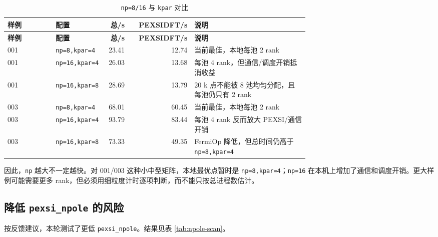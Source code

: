 \documentclass[a4paper,11pt]{article}
\newcommand{\code}[1]{\texttt{#1}}
\begin{document}
{\scriptsize
\begin{longtable}{@{}p{0.16\linewidth}p{0.16\linewidth}r r p{0.38\linewidth}@{}}
\caption{\code{np=8/16} 与 \code{kpar} 对比}
\label{tab:np8-16}\\
\toprule
\textbf{样例} & \textbf{配置} & \textbf{总/s} & \textbf{PEXSIDFT/s} & \textbf{说明}\\
\midrule
\endfirsthead
\toprule
\textbf{样例} & \textbf{配置} & \textbf{总/s} & \textbf{PEXSIDFT/s} & \textbf{说明}\\
\midrule
\endhead
001 & \code{np=8,kpar=4} & 23.41 & 12.74 & 当前最佳，本地每池 2 rank\\
001 & \code{np=16,kpar=4} & 26.03 & 13.68 & 每池 4 rank，但通信/调度开销抵消收益\\
001 & \code{np=16,kpar=8} & 28.69 & 13.79 & 20 k 点不能被 8 池均匀分配，且每池仍只有 2 rank\\
003 & \code{np=8,kpar=4} & 68.01 & 60.45 & 当前最佳，本地每池 2 rank\\
003 & \code{np=16,kpar=4} & 93.79 & 83.44 & 每池 4 rank 反而放大 PEXSI/通信开销\\
003 & \code{np=16,kpar=8} & 73.33 & 49.35 & FermiOp 降低，但总时间仍高于 \code{np=8,kpar=4}\\
\bottomrule
\end{longtable}
}

因此，\code{np} 越大不一定越快。对 001/003 这种小中型矩阵，本地最优点暂时是 \code{np=8,kpar=4}；\code{np=16} 在本机上增加了通信和调度开销。更大样例可能需要更多 rank，但必须用细粒度计时逐项判断，而不能只按总进程数估计。

\subsection{降低 \code{pexsi\_npole} 的风险}

按反馈建议，本轮测试了更低 \code{pexsi\_npole}。结果见表 \ref{tab:npole-scan}。
\end{document}
